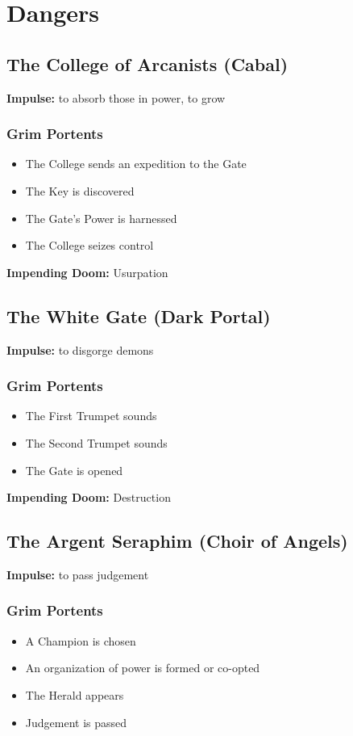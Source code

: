\section*{Dangers}
\subsection{The College of Arcanists (Cabal)}


 \textbf{Impulse:}
 to absorb those in power, to grow
\subsubsection{Grim Portents}
\begin{itemize}
\item The College sends an expedition to the Gate
\item The Key is discovered
\item The Gate's Power is harnessed
\item The College seizes control

\end{itemize}


 \textbf{Impending Doom:}
 Usurpation
\subsection{The White Gate (Dark Portal)}


 \textbf{Impulse:}
 to disgorge demons
\subsubsection{Grim Portents}
\begin{itemize}
\item The First Trumpet sounds
\item The Second Trumpet sounds
\item The Gate is opened

\end{itemize}


 \textbf{Impending Doom:}
 Destruction
\subsection{The Argent Seraphim (Choir of Angels)}


 \textbf{Impulse:}
 to pass judgement
\subsubsection{Grim Portents}
\begin{itemize}
\item A Champion is chosen
\item An organization of power is formed or co-opted
\item The Herald appears
\item Judgement is passed

\end{itemize}


